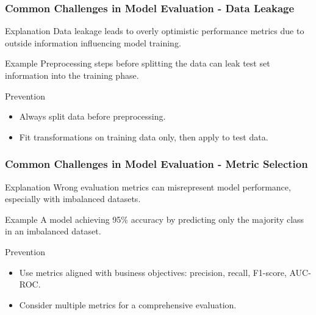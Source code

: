 \documentclass[aspectratio=169]{beamer}
\begin{document}
\begin{frame}[fragile]
    \frametitle{Common Challenges in Model Evaluation - Data Leakage}
    \begin{block}{Explanation}
        Data leakage leads to overly optimistic performance metrics due to outside information influencing model training.
    \end{block}
    
    \begin{block}{Example}
        Preprocessing steps before splitting the data can leak test set information into the training phase.
    \end{block}
    
    \begin{block}{Prevention}
        \begin{itemize}
            \item Always split data before preprocessing.
            \item Fit transformations on training data only, then apply to test data.
        \end{itemize}
    \end{block}
\end{frame}

\begin{frame}[fragile]
    \frametitle{Common Challenges in Model Evaluation - Metric Selection}
    \begin{block}{Explanation}
        Wrong evaluation metrics can misrepresent model performance, especially with imbalanced datasets.
    \end{block}
    
    \begin{block}{Example}
        A model achieving 95\% accuracy by predicting only the majority class in an imbalanced dataset.
    \end{block}
    
    \begin{block}{Prevention}
        \begin{itemize}
            \item Use metrics aligned with business objectives: precision, recall, F1-score, AUC-ROC.
            \item Consider multiple metrics for a comprehensive evaluation.
        \end{itemize}
    \end{block}
\end{frame}
\end{document}

